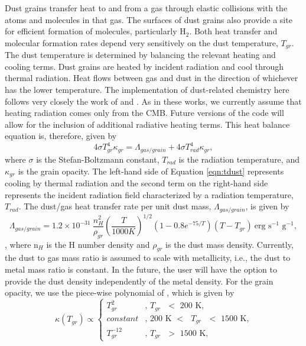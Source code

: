 Dust grains transfer heat to and from a gas through elastic collisions
with the atoms and molecules in that gas.  The surfaces of dust grains
also provide a site for efficient formation of molecules, particularly
H$_{2}$.  Both heat transfer and molecular formation rates depend very
sensitively on the dust temperature, $T_{gr}$.  The dust temperature
is determined by balancing the relevant heating and cooling terms.
Dust grains are heated by incident radiation and cool through thermal
radiation.  Heat flows between gas and dust in the direction of
whichever has the lower temperature.  The implementation of
dust-related chemistry here follows very closely the work of
\citet{2000ApJ...534..809O} and \citet{2005ApJ...626..627O}.  As in
these works, we currently assume that heating radiation comes only
from the CMB.  Future versions of the code will allow for the
inclusion of additional radiative heating terms.  This heat balance
equation is, therefore, given by
\begin{equation} \label{eqn:tdust}
4 \sigma T_{gr}^{4} \kappa_{gr} = \Lambda_{gas/grain} + 4 \sigma
T_{rad}^{4} \kappa_{gr},
\end{equation}
where $\sigma$ is the Stefan-Boltzmann constant, $T_{rad}$ is the
radiation temperature, and $\kappa_{gr}$ is the grain opacity.  The
left-hand side of Equation \ref{eqn:tdust} represents cooling by
thermal radiation and the second term on the right-hand side
represents the incident radiation field characterized by a radiation
temperature, $T_{rad}$.  The dust/gas heat transfer rate per unit dust
mass, $\Lambda_{gas/grain}$, is given by
\begin{equation} \label{eqn:gasdust}
\Lambda_{gas/grain} = 1.2\times10^{-31}~\frac{n_{H}^{2}}{\rho_{gr}}
\left(\frac{T}{1000 K}\right)^{1/2} (1 - 0.8 e^{-75 / T}) (T -
T_{gr})~\textrm{erg~s$^{-1}$~g$^{-1}$},
\end{equation}
\citep{1989ApJ...342..306H}, where n$_{H}$ is the
H number density and $\rho_{gr}$ is the dust mass density.  Currently,
the dust to gas mass ratio is assumed to scale with metallicity, i.e.,
the dust to metal mass ratio is constant.  In the future, the user
will have the option to provide the dust density independently of the
metal density.  For the grain opacity, we use the piece-wise
polynomial of \citet{2011ApJ...729L...3D}, which is given by
\begin{equation}
\kappa(T_{gr}) \propto \left\{ \begin{array}{ll}
T_{gr}^{2} & \textrm{, $T_{gr}$ $<$ 200~K,}\\
constant & \textrm{, 200~K $<$ $T_{gr}$ $<$ 1500~K,}\\
T_{gr}^{-12} & \textrm{, $T_{gr}$ $>$ 1500~K},
\end{array} \right.
\end{equation}
